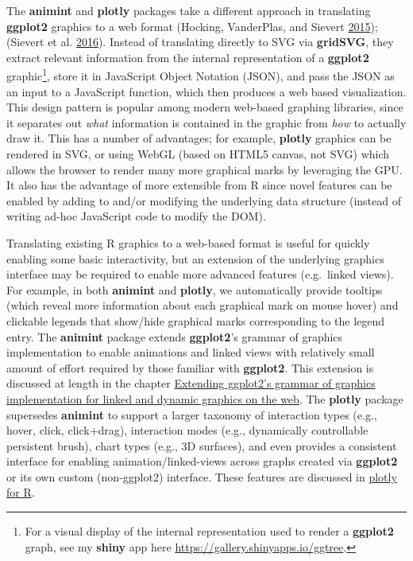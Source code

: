 \documentclass[12pt,]{isuthesis}
\let\rmarkdownfootnote\footnote%
\def\footnote{\protect\rmarkdownfootnote}
\begin{document}
The \textbf{animint} and \textbf{plotly} packages take a different
approach in translating \textbf{ggplot2} graphics to a web format
(Hocking, VanderPlas, and Sievert
\protect\hyperlink{ref-animint}{2015}); (Sievert et al.
\protect\hyperlink{ref-plotly}{2016}). Instead of translating directly
to SVG via \textbf{gridSVG}, they extract relevant information from the
internal representation of a \textbf{ggplot2} graphic\footnote{For a
  visual display of the internal representation used to render a
  \textbf{ggplot2} graph, see my \textbf{shiny} app here
  \url{https://gallery.shinyapps.io/ggtree}.}, store it in JavaScript
Object Notation (JSON), and pass the JSON as an input to a JavaScript
function, which then produces a web based visualization. This design
pattern is popular among modern web-based graphing libraries, since it
separates out \emph{what} information is contained in the graphic from
\emph{how} to actually draw it. This has a number of advantages; for
example, \textbf{plotly} graphics can be rendered in SVG, or using WebGL
(based on HTML5 canvas, not SVG) which allows the browser to render many
more graphical marks by leveraging the GPU. It also has the advantage of
more extensible from R since novel features can be enabled by adding to
and/or modifying the underlying data structure (instead of writing
ad-hoc JavaScript code to modify the DOM).

Translating existing R graphics to a web-based format is useful for
quickly enabling some basic interactivity, but an extension of the
underlying graphics interface may be required to enable more advanced
features (e.g.~linked views). For example, in both \textbf{animint} and
\textbf{plotly}, we automatically provide tooltips (which reveal more
information about each graphical mark on mouse hover) and clickable
legends that show/hide graphical marks corresponding to the legend
entry. The \textbf{animint} package extends \textbf{ggplot2}'s grammar
of graphics implementation to enable animations and linked views with
relatively small amount of effort required by those familiar with
\textbf{ggplot2}. This extension is discussed at length in the chapter
\protect\hyperlink{animint}{Extending ggplot2's grammar of graphics
implementation for linked and dynamic graphics on the web}. The
\textbf{plotly} package supersedes \textbf{animint} to support a larger
taxonomy of interaction types (e.g., hover, click, click+drag),
interaction modes (e.g., dynamically controllable persistent brush),
chart types (e.g., 3D surfaces), and even provides a consistent
interface for enabling animation/linked-views across graphs created via
\textbf{ggplot2} or its own custom (non-ggplot2) interface. These
features are discussed in
\href{https://cpsievert.github.io/plotly_book/}{plotly for R}.
\end{document}
